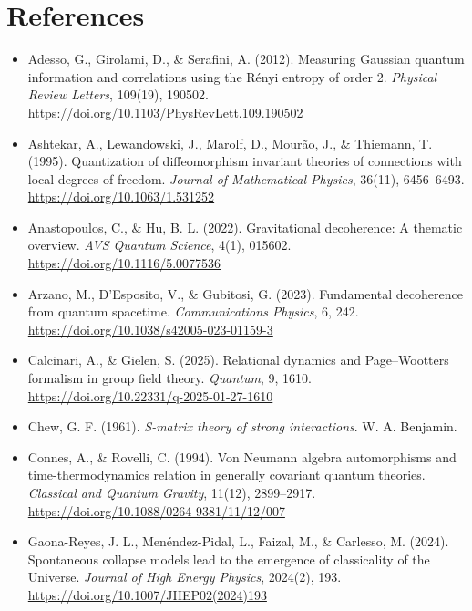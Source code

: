 \documentclass[12pt,a4paper]{article}
\numberwithin{equation}{section}
\begin{document}
\section*{\centering References}
\vspace{0.3cm}
\begin{itemize}[leftmargin=0.5in, itemindent=-0.5in, label={}]

\item Adesso, G., Girolami, D., \& Serafini, A. (2012). Measuring Gaussian quantum information and correlations using the Rényi entropy of order 2. \textit{Physical Review Letters}, 109(19), 190502. \url{https://doi.org/10.1103/PhysRevLett.109.190502}

\item Ashtekar, A., Lewandowski, J., Marolf, D., Mourão, J., \& Thiemann, T. (1995). Quantization of diffeomorphism invariant theories of connections with local degrees of freedom. \textit{Journal of Mathematical Physics}, 36(11), 6456--6493. \url{https://doi.org/10.1063/1.531252}

\item Anastopoulos, C., \& Hu, B. L. (2022). Gravitational decoherence: A thematic overview. \textit{AVS Quantum Science}, 4(1), 015602. \url{https://doi.org/10.1116/5.0077536}

\item Arzano, M., D'Esposito, V., \& Gubitosi, G. (2023). Fundamental decoherence from quantum spacetime. \textit{Communications Physics}, 6, 242. \url{https://doi.org/10.1038/s42005-023-01159-3}

\item Calcinari, A., \& Gielen, S. (2025). Relational dynamics and Page--Wootters formalism in group field theory. \textit{Quantum}, 9, 1610. \url{https://doi.org/10.22331/q-2025-01-27-1610}

\item Chew, G. F. (1961). \textit{S-matrix theory of strong interactions}. W. A. Benjamin.

\item Connes, A., \& Rovelli, C. (1994). Von Neumann algebra automorphisms and time-thermodynamics relation in generally covariant quantum theories. \textit{Classical and Quantum Gravity}, 11(12), 2899--2917. \url{https://doi.org/10.1088/0264-9381/11/12/007}

\item Gaona-Reyes, J. L., Men\'endez-Pidal, L., Faizal, M., \& Carlesso, M. (2024). Spontaneous collapse models lead to the emergence of classicality of the Universe. \textit{Journal of High Energy Physics}, 2024(2), 193. \url{https://doi.org/10.1007/JHEP02(2024)193}


\end{itemize}
\end{document}
